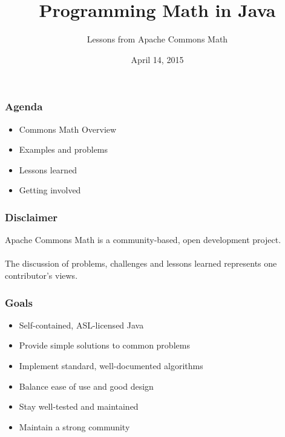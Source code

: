 \documentclass[14pt,mathserif]{beamer}
\title{Programming Math in Java}
\subtitle{Lessons from Apache Commons Math}
\author{
  \newauthor{Phil Steitz}{psteitz@apache.org}
}
\institute[Apachecon North America 2015]{Apachecon North America 2015}
\date{April 14, 2015}
\begin{document}
{
\begin{frame} %
  \titlepage
\end{frame}
}

\begin{frame}
  \frametitle{Agenda}
\begin{itemize}
  \item Commons Math Overview
  \item Examples and problems
  \item Lessons learned
  \item Getting involved
\end{itemize}

\end{frame}

\begin{frame}
  \frametitle{Disclaimer}

Apache Commons Math is a community-based, open development project. \\~\\
The discussion of problems, challenges and lessons learned represents one
contributor's views.

\end{frame}

\begin{frame}
  \frametitle{Goals}

\begin{itemize}
  \item Self-contained, ASL-licensed Java
  \item Provide simple solutions to common problems
  \item Implement standard, well-documented algorithms
  \item Balance ease of use and good design
  \item Stay well-tested and maintained
  \item Maintain a strong community
\end{itemize}

\end{frame}


\end{document}
